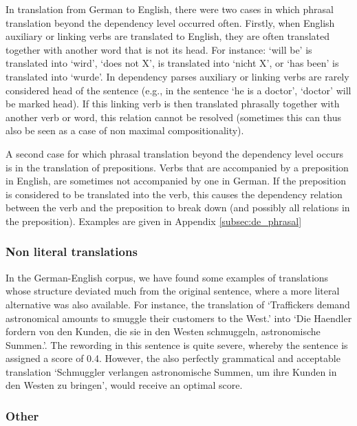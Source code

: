 In translation from German to English, there were two cases in which phrasal translation beyond the dependency level occurred often. Firstly, when English auxiliary or linking verbs are translated to English, they are often translated together with another word that is not its head. For instance: `will be' is translated into `wird', `does not X', is translated into `nicht X', or `has been' is translated into `wurde'. In dependency parses auxiliary or linking verbs are rarely considered head of the sentence (e.g., in the sentence `he is a doctor', `doctor' will be marked head). If this linking verb is then translated phrasally together with another verb or word, this relation cannot be resolved (sometimes this can thus also be seen as a case of non maximal compositionality).

A second case for which phrasal translation beyond the dependency level occurs is in the translation of prepositions. Verbs that are accompanied by a preposition in English, are sometimes not accompanied by one in German. If the preposition is considered to be translated into the verb, this causes the dependency relation between the verb and the preposition to break down (and possibly all relations in the preposition). Examples are given in Appendix \ref{subsec:de_phrasal}

\subsubsection{Non literal translations}

In the German-English corpus, we have found some examples of translations whose structure deviated much from the original sentence, where a more literal alternative was also available. For instance, the translation of `Traffickers demand astronomical amounts to smuggle their customers to the West.' into `Die Haendler fordern von den Kunden, die sie in den Westen schmuggeln, astronomische Summen.'. The rewording in this sentence is quite severe, whereby the sentence is assigned a score of 0.4. However, the also perfectly grammatical and acceptable translation `Schmuggler verlangen astronomische Summen, um ihre Kunden in den Westen zu bringen', would receive an optimal score.


\subsubsection{Other}


